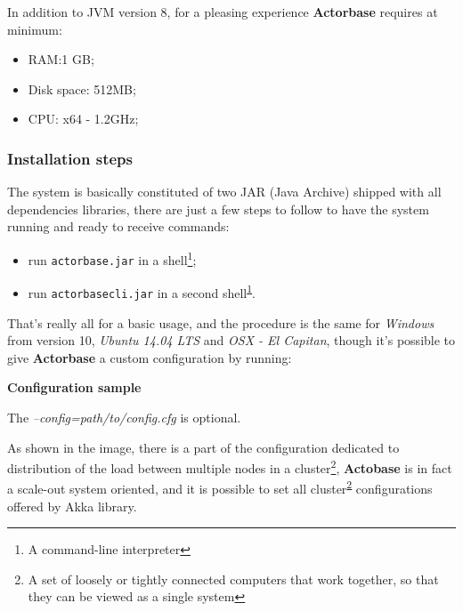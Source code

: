 \documentclass{scalatekids-article}
\begin{document}
In addition to JVM version 8, for a pleasing experience \textbf{Actorbase} requires at minimum:
\begin{itemize}
\item RAM:\@1 GB;\@
\item Disk space: 512MB;\@
\item CPU: x64 - 1.2GHz;
\end{itemize}

\subsubsection{Installation steps}

The system is basically constituted of two JAR (Java Archive) shipped with all
dependencies libraries, there are just a few steps to follow to have the system
running and ready to receive commands:
\begin{itemize}
\item run \verb=actorbase.jar= in a shell\footnote{A command-line interpreter\label{shell}};
\item run \verb=actorbasecli.jar= in a second shell\textsuperscript{\ref{shell}}.
\end{itemize}
That's really all for a basic usage, and the procedure is the same for
\textit{Windows} from version 10, \textit{Ubuntu 14.04 LTS} and \textit{OSX - El
  Capitan}, though it's possible to give \textbf{Actorbase} a custom configuration by
running:


\textbf{Configuration sample}


The \textit{--config=path/to/config.cfg} is optional.

As shown in the image, there is a part of the configuration dedicated to
distribution of the load between multiple nodes in a cluster\footnote{A set of
loosely or tightly connected computers that work together, so that they can be
viewed as a single system\label{cluster}}, \textbf{Actobase} is in fact a
scale-out system oriented, and it is possible to set all
cluster\textsuperscript{\ref{cluster}} configurations offered by Akka library.
\end{document}
